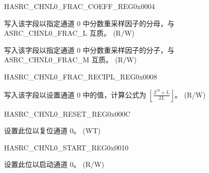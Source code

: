 \begin{register}{H}{ASRC\_CHNL0\_FRAC\_COEFF\_REG}{0x0004}\label{regdesc:ASRCCHNL0FRACCOEFFREG}
%
%
%
\regnewline%
\begin{regdesc}\begin{reglist}
\label{fielddesc:ASRCCHNL0FRACM}\item [ASRC\_CHNL0\_FRAC\_M] 写入该字段以指定通道 0 中分数重采样因子的分母，与 ASRC\_CHNL0\_FRAC\_L 互质。 (R/W)
\label{fielddesc:ASRCCHNL0FRACL}\item [ASRC\_CHNL0\_FRAC\_L] 写入该字段以指定通道 0 中分数重采样因子的分子，与 ASRC\_CHNL0\_FRAC\_M 互质。 (R/W)
\end{reglist}\end{regdesc}
\end{register}


\begin{register}{H}{ASRC\_CHNL0\_FRAC\_RECIPL\_REG}{0x0008}\label{regdesc:ASRCCHNL0FRACRECIPLREG}
%
%
\regnewline%
\begin{regdesc}\begin{reglist}
\label{fielddesc:ASRCCHNL0FRACRECIPL}\item [ASRC\_CHNL0\_FRAC\_RECIPL] 写入该字段以设置通道 0 中的值，计算公式为 \(\left\lfloor \frac{2^{19} + L}{2L} \right\rfloor\)。 (R/W)
\end{reglist}\end{regdesc}
\end{register}


\begin{register}{H}{ASRC\_CHNL0\_RESET\_REG}{0x000C}\label{regdesc:ASRCCHNL0RESETREG}
%
%
\regnewline%
\begin{regdesc}\begin{reglist}
\label{fielddesc:ASRCCHNL0RESET}\item [ASRC\_CHNL0\_RESET] 设置此位以复位通道 0。 (WT)
\end{reglist}\end{regdesc}
\end{register}


\begin{register}{H}{ASRC\_CHNL0\_START\_REG}{0x0010}\label{regdesc:ASRCCHNL0STARTREG}
%
%
\regnewline%
\begin{regdesc}\begin{reglist}
\label{fielddesc:ASRCCHNL0START}\item [ASRC\_CHNL0\_START] 设置此位以启动通道 0。 (R/W)
\end{reglist}\end{regdesc}
\end{register}


